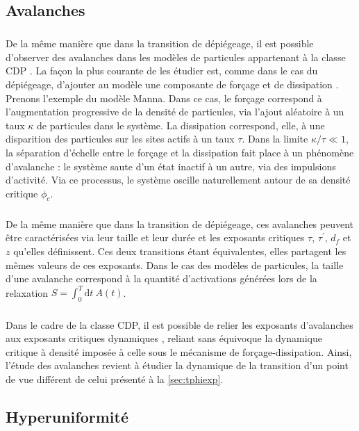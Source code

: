 \subsection{Avalanches}

\label{sec:IntroAvalanches}

\subparagraph{}De la même manière que dans la transition de dépiégeage, il est possible d'observer des avalanches dans les modèles de particules appartenant à la classe CDP \cite{lubeck_moment_2000, dickman_paths_2000}. La façon la plus courante de les étudier est, comme dans le cas du dépiégeage, d'ajouter au modèle une composante de forçage et de dissipation \cite{lubeck_universal_2004}. Prenons l'exemple du modèle Manna. Dans ce cas, le forçage correspond à l'augmentation progressive de la densité de particules, via l'ajout aléatoire à un taux $\kappa$ de particules dans le système. La dissipation correspond, elle, à une disparition des particules sur les sites actifs à un taux $\tau$. Dans la limite $\kappa/\tau \ll 1$, la séparation d'échelle entre le forçage et la dissipation fait place à un phénomène d'avalanche : le système saute d'un état inactif à un autre, via des impulsions d'activité. Via ce processus, le système oscille naturellement autour de sa densité critique $\phi_c$.

\subparagraph{}De la même manière que dans la transition de dépiégeage, ces avalanches peuvent être caractérisées via leur taille et leur durée et les exposants critiques $\tau$, $\tau^\prime$, $d_f$ et $z$ qu'elles définissent. Ces deux transitions étant équivalentes, elles partagent les mêmes valeurs de ces exposants. Dans le cas des modèles de particules, la taille d'une avalanche correspond à la quantité d'activations générées lors de la relaxation $S = \int_0^T \mathrm{d}t~ A(t)$.

\subparagraph{}Dans le cadre de la classe CDP, il est possible de relier les exposants d'avalanches aux exposants critiques dynamiques \cite{munoz_avalanche_1999, lubeck_universal_2004}, reliant sans équivoque la dynamique critique à densité imposée à celle sous le mécanisme de forçage-dissipation. Ainsi, l'étude des avalanches revient à étudier la dynamique de la transition d'un point de vue différent de celui présenté à la \autoref{sec:tphiexp}.

\subsection{Hyperuniformité}

\label{sec:introHU}

